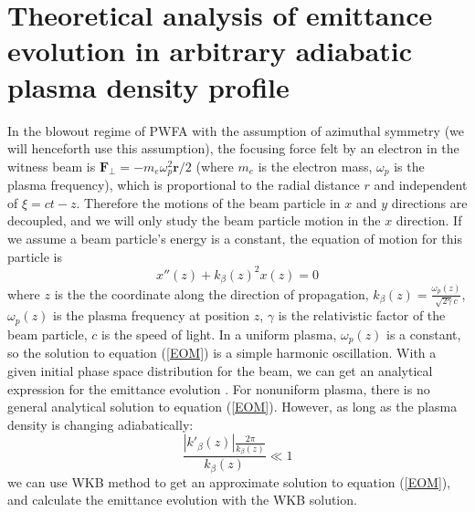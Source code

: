 \documentclass[%
reprint, superscriptaddress,
 amsmath,amssymb, aps,
prstab,
]{revtex4-2}
\begin{document}
\section{Theoretical analysis of emittance evolution in arbitrary
adiabatic plasma density profile} In the blowout regime of PWFA with the
assumption of azimuthal symmetry (we will henceforth use this assumption),
the focusing force felt by an electron in the witness beam is
$\textbf{F}_{\perp} = -m_e\omega_p^2\textbf{r}/2$ (where $m_e$ is the electron mass,
$\omega_p$ is the plasma frequency), which is proportional to the radial
distance $r$ and independent of $\xi = ct - z$. Therefore the motions of
the beam particle in $x$ and $y$ directions are decoupled, and we will
only study the beam particle motion in the $x$ direction. If we assume a
beam particle's energy is a constant, the equation of motion for this
particle is \begin{equation} x''(z)  + k_{\beta}(z)^2 x(z) = 0  \label{EOM} \end{equation} 
where $z$ is the the coordinate
along the direction of propagation, $k_{\beta}(z) = \frac{\omega_p(z)}{\sqrt{2\gamma}
c}$,  $\omega_p(z)$ is the plasma frequency at position
$z$, $\gamma$ is the relativistic factor of
the beam particle, $c$ is the speed of light. In a uniform plasma, $\omega_p(z)$ is a constant, so the solution to
equation (\ref{EOM}) is a simple harmonic oscillation. With a given
initial phase space distribution for the beam, we can get an analytical
expression for the emittance evolution\cite{Xinlu2016} \cite{German2018}.
For nonuniform plasma, there is no general analytical solution to
equation (\ref{EOM}). However, as long as the plasma density is changing
adiabatically:
\begin{equation}
\frac{|k'_{\beta}(z)| \frac{2\pi}{k_{\beta}(z)} }{k_{\beta}(z)} \ll 1
\label{adiabatic_condition} 
\end{equation}
 we can use WKB method \cite{Griffiths} to get an approximate
solution to equation (\ref{EOM}), and calculate the emittance evolution
with the WKB solution.
\end{document}
